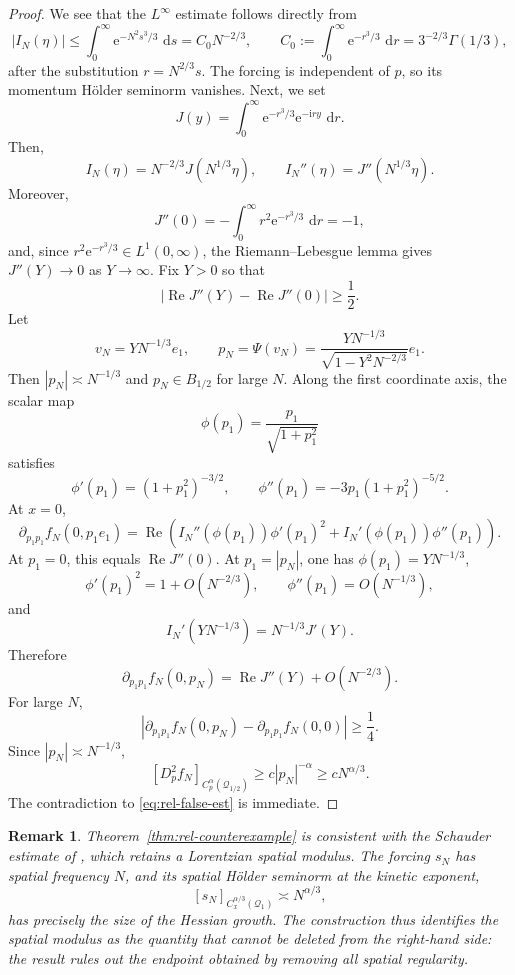 \documentclass[10pt,a4paper]{amsart}
\numberwithin{equation}{section}
\newtheorem{remark}[theorem]{Remark}
\newcommand{\ii}{\mathrm{i}}
\newcommand{\e}{\mathrm{e}}
\newcommand{\dd}{\,\mathrm{d}}
\newcommand{\abs}[1]{\left|#1\right|}
\begin{document}
\begin{proof}
We see that the $L^\infty$ estimate follows directly from
\[
   |I_N(\eta)|\le\int_0^\infty\e^{-N^2s^3/3}\,\dd s
   =C_0N^{-2/3},
   \qquad
   C_0:=\int_0^\infty\e^{-r^3/3}\,\dd r=3^{-2/3}\Gamma(1/3),
\]
after the substitution $r=N^{2/3}s$.
The forcing is independent of $p$, so its momentum H\"older seminorm vanishes. Next, we set
\[
   J(y)=\int_0^\infty\e^{-r^3/3}\e^{-\ii ry}\,\dd r.
\]
Then,
\[
   I_N(\eta)=N^{-2/3}J(N^{1/3}\eta),
   \qquad
   I_N''(\eta)=J''(N^{1/3}\eta).
\]
Moreover,
\[
   J''(0)=-\int_0^\infty r^2\e^{-r^3/3}\,\dd r=-1,
\]
and, since $r^2\e^{-r^3/3}\in L^1(0,\infty)$, the Riemann--Lebesgue lemma gives $J''(Y)\to0$ as $Y\to\infty$.  Fix $Y>0$ so that
\[
   \abs{\operatorname{Re}J''(Y)-\operatorname{Re}J''(0)}\ge\frac12.
\]
Let
\[
   v_N=YN^{-1/3}e_1,
   \qquad
   p_N=\Psi(v_N)=\frac{YN^{-1/3}}{\sqrt{1-Y^2N^{-2/3}}}e_1.
\]
Then $|p_N|\asymp N^{-1/3}$ and $p_N\in B_{1/2}$ for large $N$. Along the first coordinate axis, the scalar map
\[
   \phi(p_1)=\frac{p_1}{\sqrt{1+p_1^2}}
\]
satisfies
\[
   \phi'(p_1)=(1+p_1^2)^{-3/2},
   \qquad
   \phi''(p_1)=-3p_1(1+p_1^2)^{-5/2}.
\]
At $x=0$,
\[
   \partial_{p_1p_1}f_N(0,p_1e_1)
   =\operatorname{Re}\!\left(
      I_N''(\phi(p_1))\phi'(p_1)^2
      +I_N'(\phi(p_1))\phi''(p_1)
   \right).
\]
At $p_1=0$, this equals $\operatorname{Re}J''(0)$.  At $p_1=|p_N|$, one has $\phi(p_1)=YN^{-1/3}$,
\[
   \phi'(p_1)^2=1+O(N^{-2/3}),
   \qquad
   \phi''(p_1)=O(N^{-1/3}),
\]
and
\[
   I_N'(YN^{-1/3})=N^{-1/3}J'(Y).
\]
Therefore
\[
   \partial_{p_1p_1}f_N(0,p_N)
   =\operatorname{Re}J''(Y)+O(N^{-2/3}).
\]
For large $N$,
\[
   \abs{\partial_{p_1p_1}f_N(0,p_N)-\partial_{p_1p_1}f_N(0,0)}
   \ge\frac14.
\]
Since $|p_N|\asymp N^{-1/3}$,
\[
   [D_p^2f_N]_{C_p^\alpha(\mathcal Q_{1/2})}
   \ge c|p_N|^{-\alpha}
   \ge cN^{\alpha/3}.
\]
The contradiction to \eqref{eq:rel-false-est} is immediate.
\end{proof}


\begin{remark}\label{rem:consistency}
Theorem~\ref{thm:rel-counterexample} is consistent with the Schauder estimate of \cite[Theorem~6.5]{HSTT}, which retains a Lorentzian spatial modulus.  The forcing $s_N$ has spatial frequency $N$, and its spatial H\"older seminorm at the kinetic exponent,
\[
   [s_N]_{C_x^{\alpha/3}(\mathcal Q_1)}\asymp N^{\alpha/3},
\]
has precisely the size of the Hessian growth.  The construction thus identifies the spatial modulus as the quantity that cannot be deleted from the right-hand side: the result rules out the endpoint obtained by removing all spatial regularity.
\end{remark}
\end{document}
